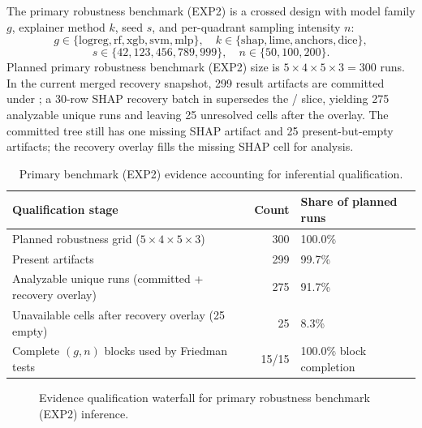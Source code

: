 \documentclass[twoside,11pt]{article}
\begin{document}
The primary robustness benchmark (EXP2) is a crossed design with model family $g$, explainer method $k$, seed $s$,
and per-quadrant sampling intensity $n$:
\[
g\in\{\text{logreg},\text{rf},\text{xgb},\text{svm},\text{mlp}\},\quad
k\in\{\text{shap},\text{lime},\text{anchors},\text{dice}\},
\]
\[
s\in\{42,123,456,789,999\},\quad
n\in\{50,100,200\}.
\]
Planned primary robustness benchmark (EXP2) size is $5\times4\times5\times3=300$ runs. In the
current merged recovery snapshot, 299 result artifacts are committed under
; a 30-row SHAP recovery batch in
 supersedes the /
slice, yielding 275 analyzable unique runs and leaving 25 unresolved cells after
the overlay. The committed tree still has one missing SHAP artifact and 25
present-but-empty artifacts; the recovery overlay fills the missing SHAP cell for
analysis.
\begin{table}[t]
\centering
\caption{Primary benchmark (EXP2) evidence accounting for inferential qualification.}
\begin{tabularx}{\linewidth}{l r X}
\toprule
\textbf{Qualification stage} & \textbf{Count} & \textbf{Share of planned runs} \\
\midrule
Planned robustness grid ($5\times4\times5\times3$) & 300 & 100.0\% \\
Present artifacts & 299 & 99.7\% \\
Analyzable unique runs (committed + recovery overlay) & 275 & 91.7\% \\
Unavailable cells after recovery overlay (25 empty) & 25 & 8.3\% \\
Complete $(g,n)$ blocks used by Friedman tests & 15/15 & 100.0\% block completion \\
\bottomrule
\end{tabularx}
\label{tab:evidence-accounting}
\end{table}

\begin{figure}[t]
\centering
{}
\caption{Evidence qualification waterfall for primary robustness benchmark (EXP2) inference.}
\label{fig:evidence-waterfall}
\end{figure}
\end{document}
